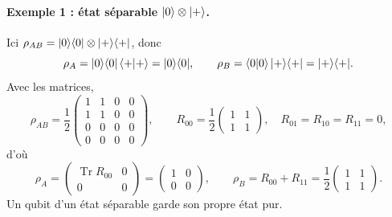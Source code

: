 \paragraph{Exemple 1 : état séparable $|0\rangle\otimes|+\rangle$.} Ici
$\rho_{AB}=|0\rangle\langle 0|\otimes|+\rangle\langle +|$, donc
\[
  \rho_A=|0\rangle\langle 0|\,\langle +|+\rangle=|0\rangle\langle 0|,
  \qquad
  \rho_B=\langle 0|0\rangle\,|+\rangle\langle +|=|+\rangle\langle +|.
\]
Avec les matrices,
\[
  \rho_{AB}=\frac12\begin{pmatrix}1&1&0&0\\1&1&0&0\\0&0&0&0\\0&0&0&0\end{pmatrix},
  \qquad
  R_{00}=\frac12\begin{pmatrix}1&1\\1&1\end{pmatrix},\quad R_{01}=R_{10}=R_{11}=0,
\]
d'où
\[
  \rho_A=\begin{pmatrix}\operatorname{Tr}R_{00}&0\\0&0\end{pmatrix}=\begin{pmatrix}1&0\\0&0\end{pmatrix},
  \qquad
  \rho_B=R_{00}+R_{11}=\frac12\begin{pmatrix}1&1\\1&1\end{pmatrix}.
\]
Un qubit d'un état séparable garde son propre état pur.

